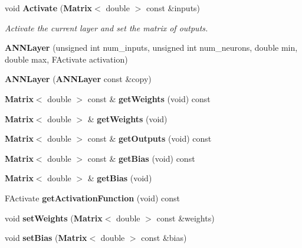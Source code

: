 \begin{DoxyCompactItemize}
\item 
void {\bf Activate} ({\bf Matrix}$<$ double $>$ const \&inputs)
\begin{DoxyCompactList}\small\item\em Activate the current layer and set the matrix of outputs. \end{DoxyCompactList}\item 
{\bfseries A\+N\+N\+Layer} (unsigned int num\+\_\+inputs, unsigned int num\+\_\+neurons, double min, double max, F\+Activate activation)\label{class_g_a_n_n_1_1_a_n_n_layer_a98a15401495eddad363a75c2ab9c5773}

\item 
{\bfseries A\+N\+N\+Layer} ({\bf A\+N\+N\+Layer} const \&copy)\label{class_g_a_n_n_1_1_a_n_n_layer_a89236bd33096986ab0efa417d4cbcb1c}

\item 
{\bf Matrix}$<$ double $>$ const \& {\bfseries get\+Weights} (void) const \label{class_g_a_n_n_1_1_a_n_n_layer_ab2ccaae743a40f1f39595f983db22a8d}

\item 
{\bf Matrix}$<$ double $>$ \& {\bfseries get\+Weights} (void)\label{class_g_a_n_n_1_1_a_n_n_layer_abd06bed4090d09e09669e9ff56b4659a}

\item 
{\bf Matrix}$<$ double $>$ const \& {\bfseries get\+Outputs} (void) const \label{class_g_a_n_n_1_1_a_n_n_layer_a47fbef47e9c7c0ef638aed2a2bd30974}

\item 
{\bf Matrix}$<$ double $>$ const \& {\bfseries get\+Bias} (void) const \label{class_g_a_n_n_1_1_a_n_n_layer_a23a78b0d4255e3480872ba6df6562290}

\item 
{\bf Matrix}$<$ double $>$ \& {\bfseries get\+Bias} (void)\label{class_g_a_n_n_1_1_a_n_n_layer_a2814de885892bd51d23d157fb7ff53a9}

\item 
F\+Activate {\bfseries get\+Activation\+Function} (void) const \label{class_g_a_n_n_1_1_a_n_n_layer_a17a2ecad13a3aac38329470e8575ed62}

\item 
void {\bfseries set\+Weights} ({\bf Matrix}$<$ double $>$ const \&weights)\label{class_g_a_n_n_1_1_a_n_n_layer_a99b44245e660160e6431f4bd8b7cf8ed}

\item 
void {\bfseries set\+Bias} ({\bf Matrix}$<$ double $>$ const \&bias)\label{class_g_a_n_n_1_1_a_n_n_layer_a33b17fa33318cc5ab3060025ccf90faf}


\end{DoxyCompactItemize}
